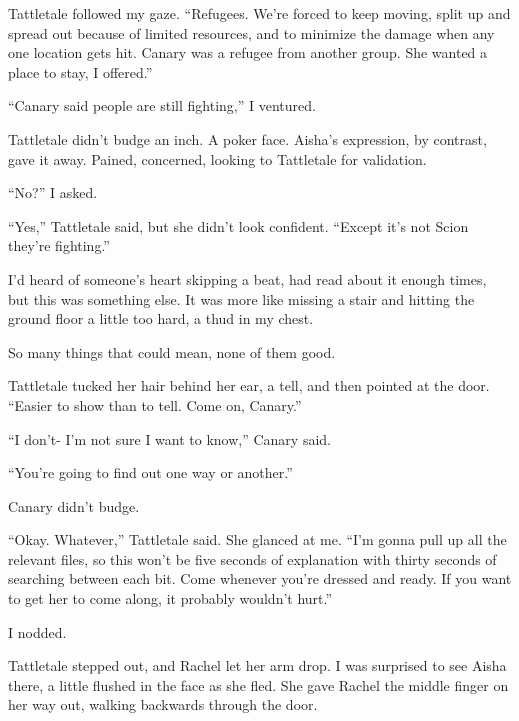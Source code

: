Tattletale followed my gaze.  ``Refugees.  We're forced to keep moving, split up and spread out because of limited resources, and to minimize the damage when any one location gets hit.  Canary was a refugee from another group.  She wanted a place to stay, I offered.''



``Canary said people are still fighting,'' I ventured.



Tattletale didn't budge an inch.  A poker face.  Aisha's expression, by contrast, gave it away.  Pained, concerned, looking to Tattletale for validation.



``No?'' I asked.



``Yes,'' Tattletale said, but she didn't look confident.  ``Except it's not Scion they're fighting.''



I'd heard of someone's heart skipping a beat, had read about it enough times, but this was something else.  It was more like missing a stair and hitting the ground floor a little too hard, a thud in my chest.



So many things that could mean, none of them good.



Tattletale tucked her hair behind her ear, a tell, and then pointed at the door.  ``Easier to show than to tell.  Come on, Canary.''



``I don't- I'm not sure I want to know,'' Canary said.



``You're going to find out one way or another.''



Canary didn't budge.



``Okay.  Whatever,'' Tattletale said.  She glanced at me.  ``I'm gonna pull up all the relevant files, so this won't be five seconds of explanation with thirty seconds of searching between each bit.  Come whenever you're dressed and ready.  If you want to get her to come along, it probably wouldn't hurt.''



I nodded.



Tattletale stepped out, and Rachel let her arm drop.  I was surprised to see Aisha there, a little flushed in the face as she fled.  She gave Rachel the middle finger on her way out, walking backwards through the door.



